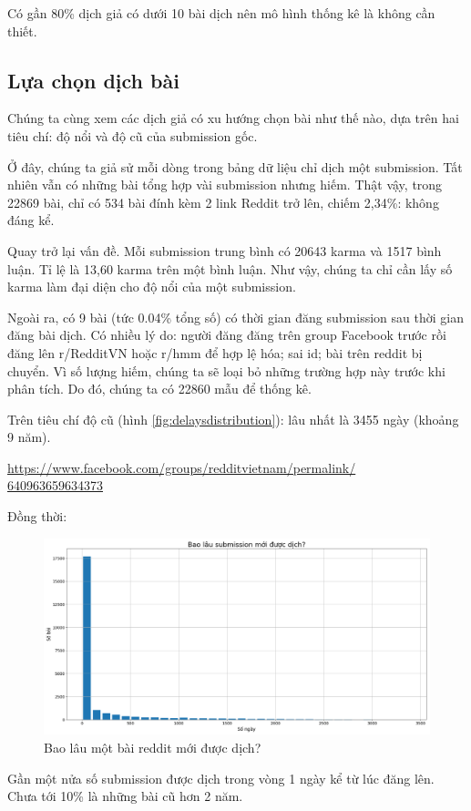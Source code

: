 \documentclass[10pt,a4paper]{article}
\begin{document}
Có gần 80\% dịch giả có dưới 10 bài dịch nên mô hình thống kê là không cần thiết.

\subsection{Lựa chọn dịch bài}
Chúng ta cùng xem các dịch giả có xu hướng chọn bài như thế nào, dựa trên hai tiêu chí: độ nổi và độ cũ của submission gốc.

Ở đây, chúng ta giả sử mỗi dòng trong bảng dữ liệu chỉ dịch một submission. Tất nhiên vẫn có những bài tổng hợp vài submission nhưng hiếm. Thật vậy, trong 22869 bài, chỉ có 534 bài đính kèm 2 link Reddit trở lên, chiếm 2,34\%: không đáng kể.

Quay trở lại vấn đề. Mỗi submission trung bình có 20643 karma và 1517 bình luận. Tỉ lệ là 13,60 karma trên một bình luận. Như vậy, chúng ta chỉ cần lấy số karma làm đại diện cho độ nổi của một submission.

Ngoài ra, có 9 bài (tức 0.04\% tổng số) có thời gian đăng submission sau thời gian đăng bài dịch. Có nhiều lý do: người đăng đăng trên group Facebook trước rồi đăng lên r/RedditVN hoặc r/hmm để hợp lệ hóa; sai id; bài trên reddit bị chuyển. Vì số lượng hiếm, chúng ta sẽ loại bỏ những trường hợp này trước khi phân tích. Do đó, chúng ta có 22860 mẫu để thống kê.

Trên tiêu chí độ cũ (hình \eqref{fig:delaysdistribution}): lâu nhất là 3455 ngày (khoảng 9 năm).

\href{https://www.facebook.com/groups/redditvietnam/permalink/640963659634373}{https://www.facebook.com/groups/redditvietnam/permalink/\\640963659634373}

Đồng thời:
\begin{figure}[!h]
    \centering
    \includegraphics[width=\textwidth]{img/DelaysDistribution.png}
    \caption{Bao lâu một bài reddit mới được dịch?}
    \label{fig:delaysdistribution}
\end{figure}
Gần một nửa số submission được dịch trong vòng 1 ngày kể từ lúc đăng lên. Chưa tới 10\% là những bài cũ hơn 2 năm.
\end{document}
